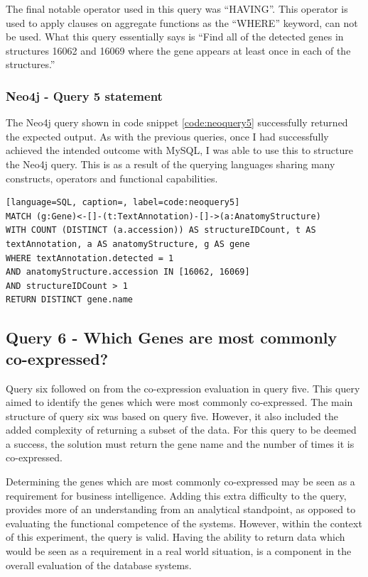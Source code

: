 The final notable operator used in this query was ``HAVING''. This operator is used to apply clauses on aggregate functions as the ``WHERE'' keyword, can not be used. What this query essentially says is ``Find all of the detected genes in structures 16062 and 16069 where the gene appears at least once in each of the structures.''

\subsubsection*{Neo4j - Query 5 statement}\label{neoquery5statement}
The Neo4j query shown in code snippet \ref{code:neoquery5} successfully returned the expected output. As with the previous queries, once I had successfully achieved the intended outcome with MySQL, I was able to use this to structure the Neo4j query. This is as a result of the querying languages sharing many constructs, operators and functional capabilities.

\begin{lstlisting}[language=SQL, caption=, label=code:neoquery5]
MATCH (g:Gene)<-[]-(t:TextAnnotation)-[]->(a:AnatomyStructure)
WITH COUNT (DISTINCT (a.accession)) AS structureIDCount, t AS textAnnotation, a AS anatomyStructure, g AS gene
WHERE textAnnotation.detected = 1
AND anatomyStructure.accession IN [16062, 16069]
AND structureIDCount > 1
RETURN DISTINCT gene.name
\end{lstlisting}

\subsection*{Query 6 - Which Genes are most commonly co-expressed?}\label{query6}
Query six followed on from the co-expression evaluation in query five. This query aimed to identify the genes which were most commonly co-expressed. The main structure of query six was based on query five. However, it also included the added complexity of returning a subset of the data. For this query to be deemed a success, the solution must return the gene name and the number of times it is co-expressed. 

Determining the genes which are most commonly co-expressed may be seen as a requirement for business intelligence. Adding this extra difficulty to the query, provides more of an understanding from an analytical standpoint, as opposed to evaluating the functional competence of the systems. However, within the context of this experiment, the query is valid. Having the ability to return data which would be seen as a requirement in a real world situation, is a component in the overall evaluation of the database systems.


